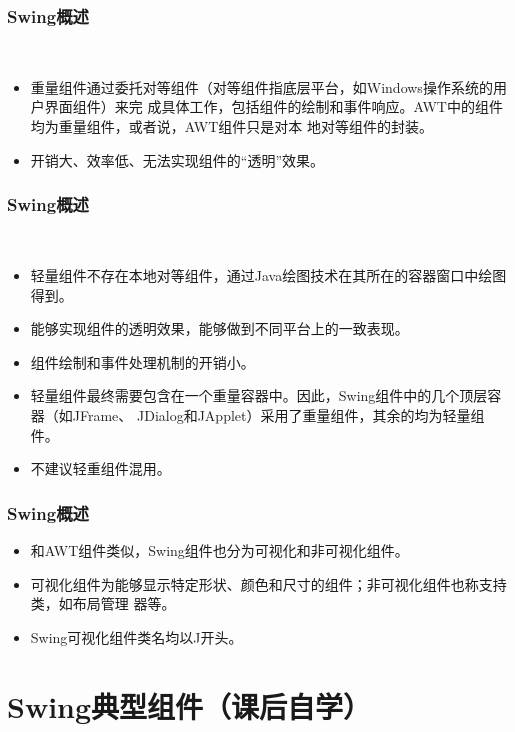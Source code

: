 \begin{frame}[fragile] %
  \frametitle{Swing概述}
  \\
  \begin{itemize}
  \item 重量组件通过委托对等组件（对等组件指底层平台，如Windows操作系统的用户界面组件）来完
    成具体工作，包括组件的绘制和事件响应。AWT中的组件均为重量组件，或者说，AWT组件只是对本
    地对等组件的封装。
  \item 开销大、效率低、无法实现组件的“透明”效果。
  \end{itemize}
\end{frame}

\begin{frame}[fragile] %
  \frametitle{Swing概述}

  \\
  \begin{itemize}
  \item 轻量组件不存在本地对等组件，通过Java绘图技术在其所在的容器窗口中绘图得到。
  \item 能够实现组件的透明效果，能够做到不同平台上的一致表现。
  \item 组件绘制和事件处理机制的开销小。
  \item 轻量组件最终需要包含在一个重量容器中。因此，Swing组件中的几个顶层容器（如JFrame、
    JDialog和JApplet）采用了重量组件，其余的均为轻量组件。
  \item 不建议轻重组件混用。
  \end{itemize}
\end{frame}

\begin{frame}[fragile] %
  \frametitle{Swing概述}

  \begin{itemize}
  \item 和AWT组件类似，Swing组件也分为可视化和非可视化组件。
  \item 可视化组件为能够显示特定形状、颜色和尺寸的组件；非可视化组件也称支持类，如布局管理
    器等。
  \item Swing可视化组件类名均以J开头。
  \end{itemize}
\end{frame}

\section{Swing典型组件（课后自学）}

